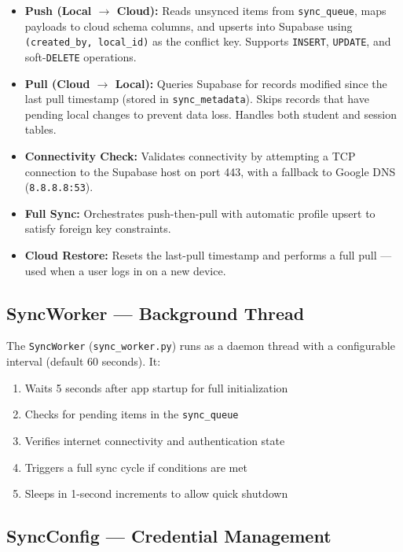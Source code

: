 \documentclass[12pt,a4paper]{article}
\begin{document}
\begin{itemize}[leftmargin=2em]
    \item \textbf{Push (Local $\rightarrow$ Cloud):} Reads unsynced items from \texttt{sync\_queue}, maps payloads to cloud schema columns, and upserts into Supabase using \texttt{(created\_by, local\_id)} as the conflict key. Supports \texttt{INSERT}, \texttt{UPDATE}, and soft-\texttt{DELETE} operations.
    \item \textbf{Pull (Cloud $\rightarrow$ Local):} Queries Supabase for records modified since the last pull timestamp (stored in \texttt{sync\_metadata}). Skips records that have pending local changes to prevent data loss. Handles both student and session tables.
    \item \textbf{Connectivity Check:} Validates connectivity by attempting a TCP connection to the Supabase host on port 443, with a fallback to Google DNS (\texttt{8.8.8.8:53}).
    \item \textbf{Full Sync:} Orchestrates push-then-pull with automatic profile upsert to satisfy foreign key constraints.
    \item \textbf{Cloud Restore:} Resets the last-pull timestamp and performs a full pull — used when a user logs in on a new device.
\end{itemize}

\subsection{SyncWorker — Background Thread}

The \texttt{SyncWorker} (\texttt{sync\_worker.py}) runs as a daemon thread with a configurable interval (default 60 seconds). It:

\begin{enumerate}[leftmargin=2em]
    \item Waits 5 seconds after app startup for full initialization
    \item Checks for pending items in the \texttt{sync\_queue}
    \item Verifies internet connectivity and authentication state
    \item Triggers a full sync cycle if conditions are met
    \item Sleeps in 1-second increments to allow quick shutdown
\end{enumerate}

\subsection{SyncConfig — Credential Management}
\end{document}
